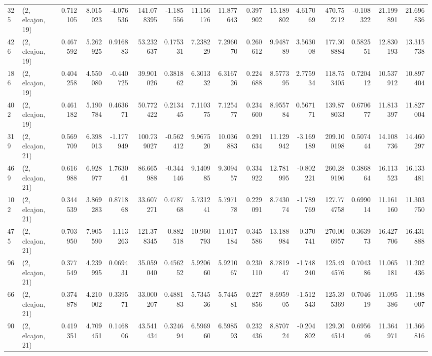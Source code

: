 \begin{tabular}{llrrrrrrrrrrrrrr}
325 &  (2, elcajon, 19) &   0.712105 &   8.015023 &  -4.076536 &   141.078395 &  -1.185556 &  11.156176 &  11.877643 &  0.397902 &  15.189802 &   4.617069 &   470.752712 & -0.108322 &  21.199891 &  21.696836 \\
426 &  (2, elcajon, 19) &   0.467592 &   5.262925 &   0.916883 &    53.232637 &   0.175331 &   7.238229 &   7.296070 &  0.260612 &   9.948789 &   3.563008 &   177.308884 &  0.582551 &  12.830193 &  13.315738 \\
186 &  (2, elcajon, 19) &   0.404258 &   4.550080 &  -0.440725 &    39.901026 &   0.381862 &   6.301332 &   6.316726 &  0.224688 &   8.577395 &   2.775934 &   118.753405 &  0.720412 &  10.537912 &  10.897404 \\
402 &  (2, elcajon, 19) &   0.461182 &   5.190784 &   0.463671 &    50.772422 &   0.213445 &   7.110375 &   7.125477 &  0.234600 &   8.955784 &   0.567171 &   139.878033 &  0.670677 &  11.813397 &  11.827004 \\
319 &  (2, elcajon, 21) &   0.569709 &   6.398013 &  -1.177949 &   100.739027 &  -0.562412 &   9.967520 &  10.036883 &  0.291634 &  11.129942 &  -3.169189 &   209.100198 &  0.507444 &  14.108736 &  14.460297 \\
469 &  (2, elcajon, 21) &   0.616988 &   6.928977 &   1.763061 &    86.665988 &  -0.344146 &   9.140985 &   9.309457 &  0.334922 &  12.781995 &  -0.802221 &   260.289196 &  0.386864 &  16.113523 &  16.133481 \\
102 &  (2, elcajon, 21) &   0.344539 &   3.869283 &   0.871868 &    33.607271 &   0.478768 &   5.731241 &   5.797178 &  0.229091 &   8.743074 &  -1.789769 &   127.774758 &  0.699014 &  11.161160 &  11.303750 \\
475 &  (2, elcajon, 21) &   0.703950 &   7.905590 &  -1.113263 &   121.378345 &  -0.882518 &  10.960793 &  11.017184 &  0.345586 &  13.188984 &  -0.370741 &   270.006957 &  0.363973 &  16.427706 &  16.431888 \\
96  &  (2, elcajon, 21) &   0.377549 &   4.239995 &   0.069431 &    35.059040 &   0.456252 &   5.920660 &   5.921067 &  0.230110 &   8.781947 &  -1.748240 &   125.494576 &  0.704386 &  11.065181 &  11.202436 \\
66  &  (2, elcajon, 21) &   0.374878 &   4.210002 &   0.339571 &    33.000207 &   0.488183 &   5.734536 &   5.744581 &  0.227856 &   8.695905 &  -1.512543 &   125.395369 &  0.704619 &  11.095386 &  11.198007 \\
90  &  (2, elcajon, 21) &   0.419351 &   4.709451 &   0.146806 &    43.541434 &   0.324694 &   6.596960 &   6.598593 &  0.232436 &   8.870724 &  -0.204802 &   129.204514 &  0.695646 &  11.364971 &  11.366816 \\

\end{tabular}
